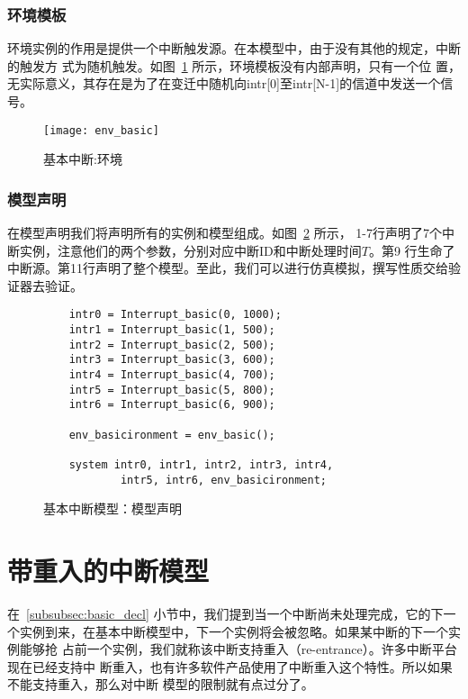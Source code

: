 \subsubsection{环境模板}
\label{subsubsec:basic_env}

环境实例的作用是提供一个中断触发源。在本模型中，由于没有其他的规定，中断的触发方
式为随机触发。如图~\ref{fig:evn_basic} 所示，环境模板没有内部声明，只有一个位
置，无实际意义，其存在是为了在变迁中随机向intr[0]至intr[N-1]的信道中发送一个信
号。

\begin{figure}[H]
	\centering
	\texttt{[image: env\_basic]}
	\caption{基本中断:环境}
	\label{fig:evn_basic}
\end{figure}

\subsubsection{模型声明}

在模型声明我们将声明所有的实例和模型组成。如图~\ref{fig:basic_model_decl} 所示，
1-7行声明了7个中断实例，注意他们的两个参数，分别对应中断ID和中断处理时间$T$。第9
行生命了中断源。第11行声明了整个模型。至此，我们可以进行仿真模拟，撰写性质交给验
证器去验证。

\begin{figure}[H]
	\centering
	\begin{lstlisting}
	intr0 = Interrupt_basic(0, 1000);
	intr1 = Interrupt_basic(1, 500);
	intr2 = Interrupt_basic(2, 500);
	intr3 = Interrupt_basic(3, 600);
	intr4 = Interrupt_basic(4, 700);
	intr5 = Interrupt_basic(5, 800);
	intr6 = Interrupt_basic(6, 900);
	
	env_basicironment = env_basic();
	
	system intr0, intr1, intr2, intr3, intr4, 
			intr5, intr6, env_basicironment;
	\end{lstlisting}
	\caption{基本中断模型：模型声明}
	\label{fig:basic_model_decl}
\end{figure}

\section{带重入的中断模型}
\label{sec:reentrant}

在~\ref{subsubsec:basic_decl} 小节中，我们提到当一个中断尚未处理完成，它的下一
个实例到来，在基本中断模型中，下一个实例将会被忽略。如果某中断的下一个实例能够抢
占前一个实例，我们就称该中断支持重入（re-entrance）。许多中断平台现在已经支持中
断重入，也有许多软件产品使用了中断重入这个特性。所以如果不能支持重入，那么对中断
模型的限制就有点过分了。

